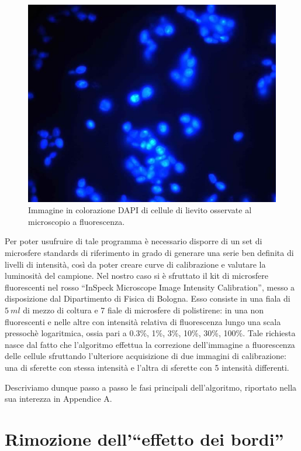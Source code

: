 \begin{figure}
 \centering
 \includegraphics[scale=.40]{img/CAP3bordi.jpg}
 \caption{\small{Immagine in colorazione DAPI di cellule di lievito osservate al microscopio a fluorescenza.}}
 \label{fig:bordi}
\end{figure}

Per poter usufruire di tale programma è necessario disporre di un set di microsfere standards di riferimento in grado di generare una serie ben definita di livelli di intensità, così da poter creare curve di calibrazione e valutare la luminosità del campione. 
Nel nostro caso si è sfruttato il kit di microsfere fluorescenti nel rosso ``InSpeck Microscope Image Intensity Calibration'', messo a disposizione dal Dipartimento di Fisica di Bologna. 
Esso consiste in una fiala di $5\ ml$ di mezzo di coltura e 7 fiale di microsfere di polistirene: in una non fluorescenti e nelle altre con intensità relativa di fluorescenza lungo una scala pressochè logaritmica, ossia pari a 0.3\%, 1\%, 3\%, 10\%, 30\%, 100\%.
Tale richiesta nasce dal fatto che l'algoritmo effettua la correzione dell'immagine a fluorescenza delle cellule sfruttando l'ulteriore acquisizione di due immagini di calibrazione: una di sferette con stessa intensità e l'altra di sferette con 5 intensità differenti.

Descriviamo dunque passo a passo le fasi principali dell'algoritmo, riportato nella sua interezza in Appendice A.

\section{Rimozione dell'``effetto dei bordi''}

